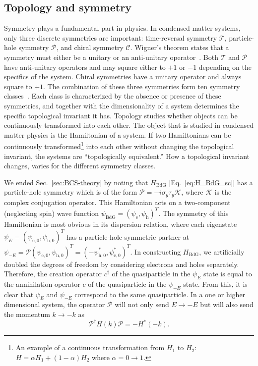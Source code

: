 \subsection{Topology and symmetry}\label{sec:topology_intro}
Symmetry plays a fundamental part in physics.
In condensed matter systems, only three discrete symmetries are important: time-reversal symmetry $\mathcal{T}$, particle-hole symmetry $\mathcal{P}$, and chiral symmetry $\mathcal{C}$.
Wigner's theorem states that a symmetry must either be a unitary or an anti-unitary operator~\cite{Wigner1931}.
Both $\mathcal{T}$ and $\mathcal{P}$ have anti-unitary operators and may square either to $+1$ or $-1$ depending on the specifics of the system.
Chiral symmetries have a unitary operator and always square to $+1$.
The combination of these three symmetries form ten symmetry classes~\cite{Altland1997}.
Each class is characterized by the absence or presence of these symmetries, and together with the dimensionality of a system determines the specific topological invariant it has.
Topology studies whether objects can be continuously transformed into each other.
The object that is studied in condensed matter physics is the Hamiltonian of a system.
If two Hamiltonians can be continuously transformed\footnote{An example of a continuous transformation from $H_{1}$ to $H_{2}$: $H=\alpha H_{1}+(1-\alpha)H_{2}$ where $\alpha=0\rightarrow1$.} into each other without changing the topological invariant, the systems are ``topologically equivalent.''
How a topological invariant changes, varies for the different symmetry classes.

We ended Sec.~\ref{sec:BCS-theory} by noting that $H_{\textrm{BdG}}$ [Eq.~\eqref{eq:H_BdG_sc}] has a particle-hole symmetry which is of the form $\mathcal{P} = -i \sigma_y \tau_y \mathcal{K}$, where $\mathcal{K}$ is the complex conjugation operator.
This Hamiltonian acts on a two-component (neglecting spin) wave function $\psi_{\textrm{BdG}}=\left(\psi_\textrm{e}, \psi_\textrm{h} \right)^{T}$.
The symmetry of this Hamiltonian is most obvious in its dispersion relation, where each eigenstate $\psi_{E}=\left(\psi_{\textrm{e},0},\psi_{\textrm{h},0}\right)^{T}$ has a particle-hole symmetric partner at $\psi_{-E}=\mathcal{P}\left(\psi_{\textrm{e},0},\psi_{\textrm{h},0}\right)^{T}=\left(-\psi_{\textrm{h},0}^*, \psi_{\textrm{e},0}^*\right)^{T}$.
In constructing $H_{\textrm{BdG}}$, we artificially doubled the degrees of freedom by considering electrons and holes separately.
Therefore, the creation operator $c^{\dagger}$ of the quasiparticle in the $\psi_{E}$ state is equal to the annihilation operator $c$ of the quasiparticle in the $\psi_{-E}$ state.
From this, it is clear that $\psi_{E}$ and $\psi_{-E}$ correspond to the same quasiparticle.
In a one or higher dimensional system, the operator $\mathcal{P}$ will not only send $E \rightarrow -E$ but will also send the momentum $k \rightarrow -k$ as
\begin{equation}
\mathcal{P^{\dagger}}H\left(k\right)\mathcal{P}=-H^*\left(-k\right).
\end{equation}

